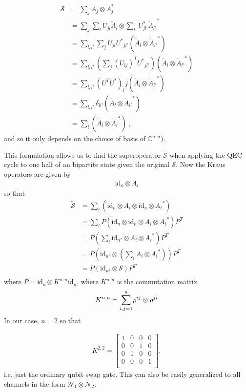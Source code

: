 \documentclass[twoside]{article}
\newcommand{\N}{\mathcal N}
\begin{document}
\begin{align}
\mathcal{S} &= \sum_j A_j \otimes A_j^*\\
&= \sum_j \sum_{l}U_{jl}\tilde{A}_l \otimes \sum_{l'}U_{jl'}^*{\tilde{A}_{l'}}^*\\
&=\sum_{l,l'}\sum_jU_{jl}{U^*}_{jl'} \left(\tilde{A}_l\otimes {\tilde{A}_{l'}}^*\right)\\
&=\sum_{l,l'}\left(\sum_j\left(U_{lj}\right)^T{U^*}_{jl'}\right) \left(\tilde{A}_l\otimes {\tilde{A}_{l'}}^*\right)\\
&=\sum_{l,l'}\left(U^TU^*\right)_ij \left(\tilde{A}_l\otimes {\tilde{A}_{l'}}^*\right)\\
&=\sum_{l,l'}\delta_{l l'}\left(\tilde{A}_l\otimes {\tilde{A}_{l'}}^*\right)\\
&= \sum_{l}\left(\tilde{A}_l\otimes {\tilde{A}_{l}}^*\right)\ ,
\end{align}
and so it only depends on the choice of basis of $\mathbb{C}^{n,n}$).


This formulation allows us to find the superoperator $\tilde{\mathcal{S}}$ when applying the QEC cycle to one half of an bipartite state given the original $\mathcal{S}$. Now the Kraus operators are given by
\begin{align}
\mathrm{id}_{n} \otimes A_i
\end{align}
so that
\begin{align}
\tilde{\mathcal{S}} &= \sum_{i}\left(\mathrm{id}_{n}\otimes A_i\otimes\mathrm{id}_{n}\otimes  {A_i}^*\right)\\
& = \sum_{i}P\left(\mathrm{id}_{n}\otimes \mathrm{id}_{n}\otimes A_i\otimes  {A_i}^*\right)P^T\\
& = P\left(\sum_{i}\mathrm{id}_{n^2}\otimes A_i\otimes  {A_i}^*\right)P^T\\
& = P\left( \mathrm{id}_{n^2}\otimes\left(\sum_{i} A_i\otimes  {A_i}^*\right)\right)P^T\\
& = P\left( \mathrm{id}_{n^2}\otimes\mathcal{S}\right)P^T\\
\end{align}
where $P = \mathrm{id}_n \otimes K^{n,n}\mathrm{id}_n$, where $K^{n,n}$ is the commutation matrix
\begin{align}
K^{n,n} = \sum_{i,j=1}^n\hspace{-0.5mm}\rho^{ij}\otimes \rho^{ji}
\end{align}
In our case, $n = 2$ so that

\begin{align}
K^{2,2} = \begin{bmatrix}
1 & 0 & 0 & 0\\
0 & 0 & 1 & 0\\
0 & 1 & 0 & 0\\
0 & 0 & 0 & 1\\
\end{bmatrix},
\end{align}
i.e. just the ordinary qubit swap gate. This can also be easily generalized to all channels in the form $\N_1 \otimes \N_2$.
\end{document}
